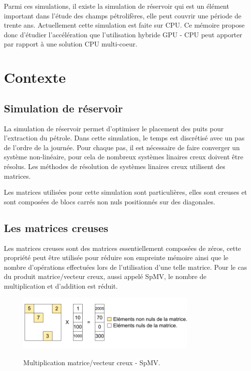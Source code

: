 \documentclass[a4paper,11pt]{report}
\begin{document}
 Parmi ces simulations, il existe
 la simulation de réservoir qui est un élément important dans l’étude des
 champs pétrolifères, elle peut couvrir une période de trente ans.
 Actuellement cette simulation est faite sur CPU.
 Ce mémoire propose donc d'étudier l'accélération que l'utilisation
 hybride GPU - CPU peut apporter par rapport à une solution CPU multi-coeur.
 
\chapter{Contexte}
 \section{Simulation de réservoir}
  La simulation de réservoir permet d’optimiser le placement
  des puits pour l'extraction du pétrole. Dans cette simulation, le
  temps est discrétisé avec un pas de l'ordre de la journée. Pour
  chaque pas, il est nécessaire de faire converger un système
  non-linéaire, pour cela de nombreux systèmes linaires creux doivent
  être résolus. Les méthodes de résolution de systèmes linaires creux
  utilisent des matrices.

  Les matrices utilisées
  pour cette simulation sont particulières, elles sont creuses
  et sont composées de blocs carrés non nuls positionnés sur des
  diagonales.
  

 \section{Les matrices creuses}
  Les matrices creuses sont des matrices essentiellement composées de zéros,
  cette propriété peut être utilisée pour réduire son empreinte
  mémoire ainsi que le nombre
  d'opérations effectuées lors de l'utilisation d'une telle matrice.
  Pour le cas du produit matrice/vecteur creux, aussi appelé SpMV, le
  nombre de multiplication et d'addition est réduit.

   \begin{figure}[h!]\begin{center}
     \includegraphics[width=0.8\textwidth]{images/spmv.pdf}
     \label{spmv_sample}
     \caption{Multiplication matrice/vecteur creux - SpMV.}
   \end{center}\end{figure}
\end{document}
